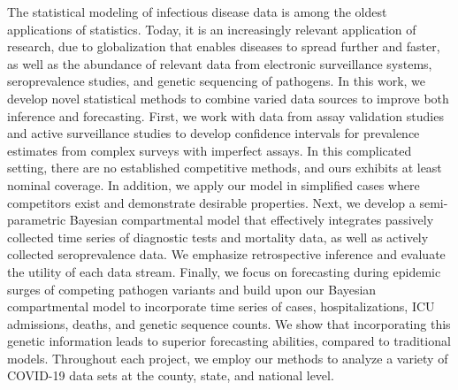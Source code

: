 {%







}

\thesisabstract
{
  The statistical modeling of infectious disease data is among the oldest applications of statistics. Today, it is an increasingly relevant application of research, due to globalization that enables diseases to spread further and faster, as well as the abundance of relevant data from electronic surveillance systems, seroprevalence studies, and genetic sequencing of pathogens. In this work, we develop novel statistical methods to combine varied data sources to improve both inference and forecasting. First, we work with data from assay validation studies and active surveillance studies to develop confidence intervals for prevalence estimates from complex surveys with imperfect assays. In this complicated setting, there are no established competitive methods, and ours exhibits at least nominal coverage. In addition, we apply our model in simplified cases where competitors exist and demonstrate desirable properties. Next, we develop a semi-parametric Bayesian compartmental model that effectively integrates passively collected time series of diagnostic tests and mortality data, as well as actively collected seroprevalence data. We emphasize retrospective inference and evaluate the utility of each data stream. Finally, we focus on forecasting during epidemic surges of competing pathogen variants and build upon our Bayesian compartmental model to incorporate time series of cases, hospitalizations, ICU admissions, deaths, and genetic sequence counts. We show that incorporating this genetic information leads to superior forecasting abilities, compared to traditional models. Throughout each project, we employ our methods to analyze a variety of COVID-19 data sets at the county, state, and national level.
}


